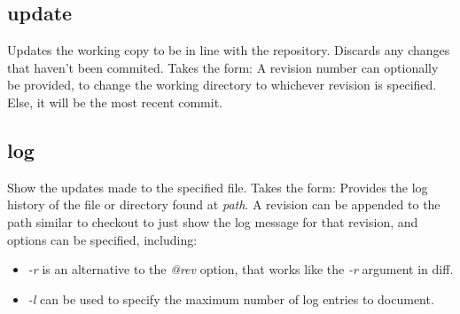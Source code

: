 \documentclass{article}
\begin{document}
\subsection{update}
Updates the working copy to be in line with the repository. Discards any changes that haven't been commited. Takes the form:
A revision number can optionally be provided, to change the working directory to whichever revision is specified. Else, it will be the most recent commit.

\subsection{log}
Show the updates made to the specified file. Takes the form:
Provides the log history of the file or directory found at \textit{path}. A revision can be appended to the path similar to checkout to just show the log message for that revision, and options can be specified, including:
\begin{itemize}
    \item \textit{-r} is an alternative to the \textit{@rev} option, that works like the \textit{-r} argument in diff.
    \item \textit{-l} can be used to specify the maximum number of log entries to document.
\end{itemize}

\newpage
\end{document}
